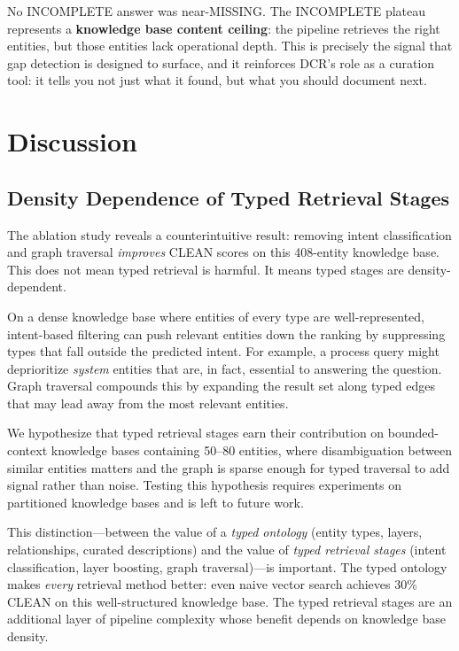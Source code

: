 \documentclass[11pt,a4paper]{article}
\begin{document}
No INCOMPLETE answer was near-MISSING. The INCOMPLETE plateau represents a \textbf{knowledge base content ceiling}: the pipeline retrieves the right entities, but those entities lack operational depth. This is precisely the signal that gap detection is designed to surface, and it reinforces DCR's role as a curation tool: it tells you not just what it found, but what you should document next.

\section{Discussion}
\label{sec:discussion}

\subsection{Density Dependence of Typed Retrieval Stages}
\label{sec:density}

The ablation study reveals a counterintuitive result: removing intent classification and graph traversal \emph{improves} CLEAN scores on this 408-entity knowledge base. This does not mean typed retrieval is harmful. It means typed stages are density-dependent.

On a dense knowledge base where entities of every type are well-represented, intent-based filtering can push relevant entities down the ranking by suppressing types that fall outside the predicted intent. For example, a process query might deprioritize \textit{system} entities that are, in fact, essential to answering the question. Graph traversal compounds this by expanding the result set along typed edges that may lead away from the most relevant entities.

We hypothesize that typed retrieval stages earn their contribution on bounded-context knowledge bases containing 50--80 entities, where disambiguation between similar entities matters and the graph is sparse enough for typed traversal to add signal rather than noise. Testing this hypothesis requires experiments on partitioned knowledge bases and is left to future work.

This distinction---between the value of a \emph{typed ontology} (entity types, layers, relationships, curated descriptions) and the value of \emph{typed retrieval stages} (intent classification, layer boosting, graph traversal)---is important. The typed ontology makes \emph{every} retrieval method better: even naive vector search achieves 30\% CLEAN on this well-structured knowledge base. The typed retrieval stages are an additional layer of pipeline complexity whose benefit depends on knowledge base density.
\end{document}
